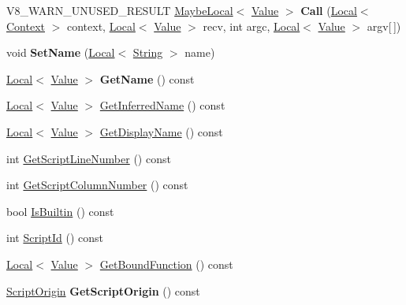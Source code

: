 \begin{DoxyCompactItemize}
\item 
\hypertarget{classv8_1_1Function_a70c400602e70488f7c066b950219a1ad}{}V8\+\_\+\+W\+A\+R\+N\+\_\+\+U\+N\+U\+S\+E\+D\+\_\+\+R\+E\+S\+U\+L\+T \hyperlink{classv8_1_1MaybeLocal}{Maybe\+Local}$<$ \hyperlink{classv8_1_1Value}{Value} $>$ {\bfseries Call} (\hyperlink{classv8_1_1Local}{Local}$<$ \hyperlink{classv8_1_1Context}{Context} $>$ context, \hyperlink{classv8_1_1Local}{Local}$<$ \hyperlink{classv8_1_1Value}{Value} $>$ recv, int argc, \hyperlink{classv8_1_1Local}{Local}$<$ \hyperlink{classv8_1_1Value}{Value} $>$ argv\mbox{[}$\,$\mbox{]})\label{classv8_1_1Function_a70c400602e70488f7c066b950219a1ad}

\item 
\hypertarget{classv8_1_1Function_aa9f51cea2036e0caa317e3955109856d}{}void {\bfseries Set\+Name} (\hyperlink{classv8_1_1Local}{Local}$<$ \hyperlink{classv8_1_1String}{String} $>$ name)\label{classv8_1_1Function_aa9f51cea2036e0caa317e3955109856d}

\item 
\hypertarget{classv8_1_1Function_a84068b5a54d85aa2412d2bcf8c05f99e}{}\hyperlink{classv8_1_1Local}{Local}$<$ \hyperlink{classv8_1_1Value}{Value} $>$ {\bfseries Get\+Name} () const \label{classv8_1_1Function_a84068b5a54d85aa2412d2bcf8c05f99e}

\item 
\hyperlink{classv8_1_1Local}{Local}$<$ \hyperlink{classv8_1_1Value}{Value} $>$ \hyperlink{classv8_1_1Function_a2665736fdec019bc7d12003ef880f78f}{Get\+Inferred\+Name} () const 
\item 
\hyperlink{classv8_1_1Local}{Local}$<$ \hyperlink{classv8_1_1Value}{Value} $>$ \hyperlink{classv8_1_1Function_a71bbe599304109844270e6e03827b02b}{Get\+Display\+Name} () const 
\item 
int \hyperlink{classv8_1_1Function_ae64de1b9dc1ea5dc4f419a88808c12c5}{Get\+Script\+Line\+Number} () const 
\item 
int \hyperlink{classv8_1_1Function_abfe6a9251c5dfc995b83dcf3032fdc86}{Get\+Script\+Column\+Number} () const 
\item 
bool \hyperlink{classv8_1_1Function_a4279e2bfca281cda9afdaf86c87d644d}{Is\+Builtin} () const 
\item 
int \hyperlink{classv8_1_1Function_afa208e62e702f6d61ba0a4250ba3f2cf}{Script\+Id} () const 
\item 
\hyperlink{classv8_1_1Local}{Local}$<$ \hyperlink{classv8_1_1Value}{Value} $>$ \hyperlink{classv8_1_1Function_a937dc089e1ef728eec4a628072250e4d}{Get\+Bound\+Function} () const 
\item 
\hypertarget{classv8_1_1Function_af9c77c9bcbf698727071c7153e7c2513}{}\hyperlink{classv8_1_1ScriptOrigin}{Script\+Origin} {\bfseries Get\+Script\+Origin} () const \label{classv8_1_1Function_af9c77c9bcbf698727071c7153e7c2513}

\end{DoxyCompactItemize}

